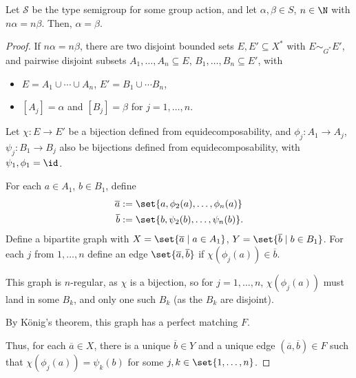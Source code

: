 \documentclass[10pt]{mypackage}
\begin{document}
  \begin{theorem}
    Let $\mathcal{S}$ be the type semigroup for some group action, and let $\alpha,\beta \in S$, $n\in \N$ with $n\alpha = n\beta$. Then, $\alpha = \beta$.
  \end{theorem}
  \begin{proof}
    If $n\alpha = n\beta$, there are two disjoint bounded sets $E,E'\subseteq X^{\ast}$ with $E\sim_{G^{\ast}}E'$, and pairwise disjoint subsets $A_1,\dots,A_n\subseteq E$, $B_1,\dots,B_n\subseteq E'$, with
    \begin{itemize}
      \item $E = A_1\cup \cdots \cup A_n$, $E' = B_1\cup \cdots B_n$,
      \item $\left[A_{j}\right] = \alpha$ and $\left[B_j\right] = \beta$ for $j=1,\dots,n$.
    \end{itemize}
    Let $\chi: E\rightarrow E'$ be a bijection defined from equidecomposability, and $\phi_j: A_1\rightarrow A_j$, $\psi_j: B_1\rightarrow B_j$ also be bijections defined from equidecomposability, with $\psi_1,\phi_1 = \id$.\newline

    For each $a\in A_1$, $b\in B_1$, define
    \begin{align*}
      \overline{a} &:= \set{a,\phi_2(a),\dots,\phi_n(a)}\\
      \overline{b} &:= \set{b,\psi_2(b),\dots,\psi_n(b)}.
    \end{align*}
    Define a bipartite graph with $X = \set{\overline{a}\mid a\in A_1}$, $Y = \set{\overline{b}\mid b\in B_1}$. For each $j$ from $1,\dots,n$ define an edge $\set{\overline{a},\overline{b}}$ if $\chi\left(\phi_j\left(a\right)\right)\in \overline{b}$.\newline

    This graph is $n$-regular, as $\chi$ is a bijection, so for $j = 1,\dots,n$, $\chi\left(\phi_j(a)\right)$ must land in some $B_k$, and only one such $B_k$ (as the $B_k$ are disjoint).\newline

    By König's theorem, this graph has a perfect matching $F$.\newline

    Thus, for each $\overline{a}\in X$, there is a unique $\overline{b}\in Y$ and a unique edge $\left(\overline{a},\overline{b}\right)\in F$ such that $\chi\left(\phi_j\left(a\right)\right) = \psi_k\left(b\right)$ for some $j,k \in \set{1,\dots,n}$.\newline


\end{proof}
\end{document}
